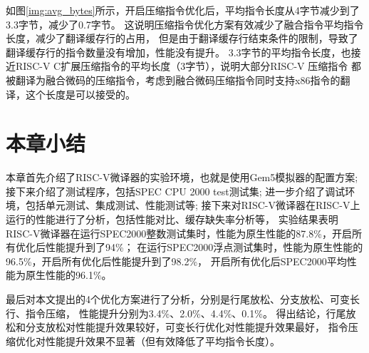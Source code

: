 如图\ref{img:avg_bytes}所示，开启压缩指令优化后，平均指令长度从4字节减少到了3.3字节，减少了0.7字节。
这说明压缩指令优化方案有效减少了融合指令平均指令长度，减少了翻译缓存行的占用，
但是由于翻译缓存行结束条件的限制，导致了翻译缓存行的指令数量没有增加，性能没有提升。
3.3字节的平均指令长度，也接近RISC-V C扩展压缩指令的平均长度（3字节），说明大部分RISC-V 压缩指令
都被翻译为融合微码的压缩指令，考虑到融合微码压缩指令同时支持x86指令的翻译，这个长度是可以接受的。


\section{本章小结}

本章首先介绍了RISC-V微译器的实验环境，也就是使用Gem5模拟器的配置方案;
接下来介绍了测试程序，包括SPEC CPU 2000 test测试集;
进一步介绍了调试环境，包括单元测试、集成测试、性能测试等;
接下来对RISC-V微译器在RISC-V上运行的性能进行了分析，包括性能对比、缓存缺失率分析等，
实验结果表明RISC-V微译器在运行SPEC2000整数测试集时，性能为原生性能的87.8\%，开启所有优化后性能提升到了94\%；
在运行SPEC2000浮点测试集时，性能为原生性能的96.5\%，开启所有优化后性能提升到了98.2\%，
开启所有优化后SPEC2000平均性能为原生性能的96.1\%。

最后对本文提出的4个优化方案进行了分析，分别是行尾放松、分支放松、可变长行、指令压缩，
性能提升分别为3.4\%、2.0\%、4.4\%、0.1\%。
得出结论，行尾放松和分支放松对性能提升效果较好，可变长行优化对性能提升效果最好，
指令压缩优化对性能提升效果不显著（但有效降低了平均指令长度）。